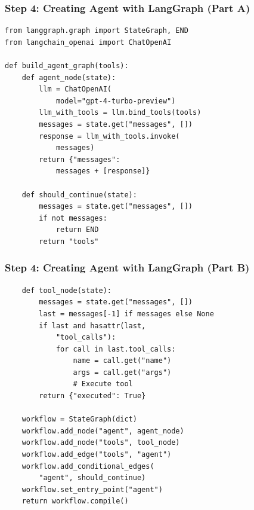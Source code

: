 \documentclass[aspectratio=169,11pt]{beamer}
\begin{document}
\begin{frame}[fragile]
  \frametitle{Step 4: Creating Agent with LangGraph (Part A)}

  \begin{lstlisting}
from langgraph.graph import StateGraph, END
from langchain_openai import ChatOpenAI

def build_agent_graph(tools):
    def agent_node(state):
        llm = ChatOpenAI(
            model="gpt-4-turbo-preview")
        llm_with_tools = llm.bind_tools(tools)
        messages = state.get("messages", [])
        response = llm_with_tools.invoke(
            messages)
        return {"messages":
            messages + [response]}

    def should_continue(state):
        messages = state.get("messages", [])
        if not messages:
            return END
        return "tools"
  \end{lstlisting}
\end{frame}

\begin{frame}[fragile]
  \frametitle{Step 4: Creating Agent with LangGraph (Part B)}

  \begin{lstlisting}
    def tool_node(state):
        messages = state.get("messages", [])
        last = messages[-1] if messages else None
        if last and hasattr(last,
            "tool_calls"):
            for call in last.tool_calls:
                name = call.get("name")
                args = call.get("args")
                # Execute tool
        return {"executed": True}

    workflow = StateGraph(dict)
    workflow.add_node("agent", agent_node)
    workflow.add_node("tools", tool_node)
    workflow.add_edge("tools", "agent")
    workflow.add_conditional_edges(
        "agent", should_continue)
    workflow.set_entry_point("agent")
    return workflow.compile()
  \end{lstlisting}
\end{frame}
\end{document}
